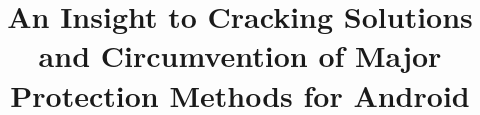 \documentclass{sig-alternate}
\begin{document}
%

\title{An Insight to Cracking Solutions and Circumvention of Major Protection Methods for Android}



%
%
%
%
%
\end{document}
